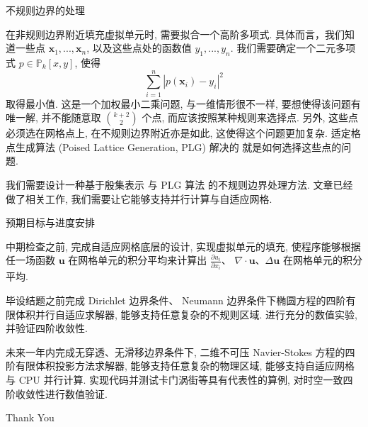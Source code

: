 \documentclass[10pt]{beamer}
\begin{document}
\begin{frame}[fragile]{不规则边界的处理}
    \footnotesize

    在非规则边界附近填充虚拟单元时, 
    需要拟合一个高阶多项式. 具体而言，我们知道一些点 
    $\mathbf{x}_1,...,\mathbf{x}_n$, 
    以及这些点处的函数值 $y_1,...,y_n$. 
    我们需要确定一个二元多项式 $p\in \mathbb{P}_k[x,y]$, 使得
    \begin{equation}
        \sum_{i=1}^n |p(\mathbf{x}_i)-y_i|^2
    \end{equation}
    取得最小值. 这是一个加权最小二乘问题, 
    与一维情形很不一样, 要想使得该问题有唯一解, 
    并不能随意取 $\binom{k+2}{2}$ 个点, 
    而应该按照某种规则来选择点. 
    另外, 这些点必须选在网格点上, 
    在不规则边界附近亦是如此, 
    这使得这个问题更加复杂.
    适定格点生成算法 (Poised Lattice Generation, PLG)\cite{PLG} 解决的
    就是如何选择这些点的问题.

    我们需要设计一种基于殷集表示\cite{YinSet2D} 与 PLG 算法
    的不规则边界处理方法.
    文章\cite{lzx}已经做了相关工作,
    我们需要让它能够支持并行计算与自适应网格.
\end{frame}

\begin{frame}[fragile]{预期目标与进度安排}
    \footnotesize

    中期检查之前, 完成自适应网格底层的设计, 
    实现虚拟单元的填充, 使程序能够根据任一场函数 $\mathbf{u}$ 
    在网格单元的积分平均来计算出 
    $\frac{\partial u_i}{\partial x_i}$、
    $\nabla\cdot \mathbf{u}$、$\Delta \mathbf{u}$ 
    在网格单元的积分平均. 

    \pause\vspace{1em}
    毕设结题之前完成 Dirichlet 边界条件、
    Neumann 边界条件下椭圆方程的四阶有限体积并行自适应求解器,
    能够支持任意复杂的不规则区域.
    进行充分的数值实验, 并验证四阶收敛性.

    \pause\vspace{1em}
    未来一年内完成无穿透、无滑移边界条件下, 
    二维不可压 Navier-Stokes 方程的四阶有限体积投影方法求解器, 
    能够支持任意复杂的物理区域, 能够支持自适应网格与 CPU 并行计算. 
    实现代码并测试卡门涡街等具有代表性的算例, 
    对时空一致四阶收敛性进行数值验证. 
\end{frame}

\begin{frame}[allowframebreaks]
    \tiny
    
    
    \nocite{*} %
\end{frame}


\begin{frame}
    \begin{center}
        {\Huge\calligra Thank You}
    \end{center}
\end{frame}
\end{document}
